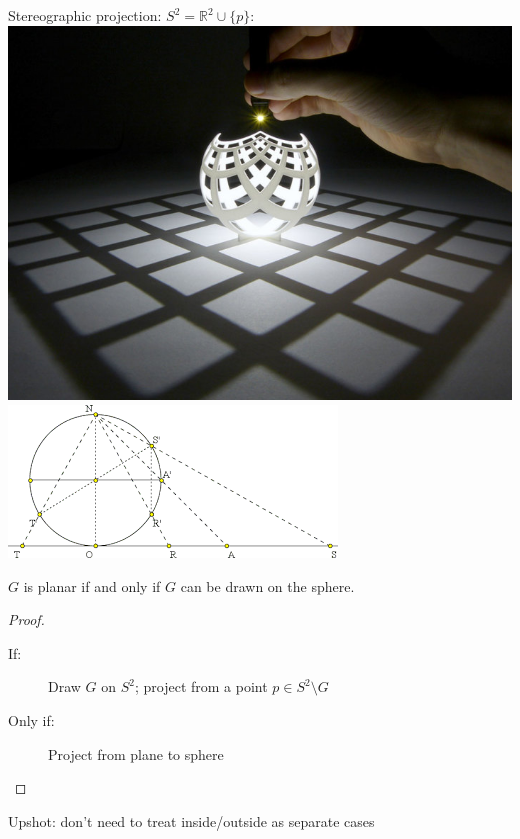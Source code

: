 \documentclass{beamer}
\begin{document}
\begin{frame}{Stereographic projection: $S^2=\mathbb{R}^2\cup \{p\}$:}
  \includegraphics[width=.4\textwidth]{Pictures/stereographicSegerman.jpg}
  \includegraphics[width=.6\textwidth]{Pictures/stereographic2d.png}
\begin{corollary}
$G$ is planar if and only if $G$ can be drawn on the sphere.
  \end{corollary}
\begin{proof}
\begin{description}
    \item[If:] Draw $G$ on $S^2$; project from a point $p\in S^2\setminus G$
   \item[Only if:] Project from plane to sphere
     \end{description}
  \end{proof}
\begin{block}{Upshot: don't need to treat inside/outside as separate cases}
  \end{block}

  \end{frame}
\end{document}

